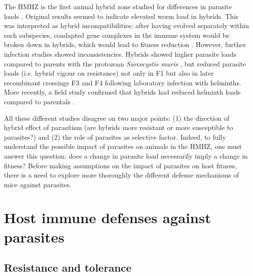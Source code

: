 The HMHZ is the first animal hybrid zone studied for differences in parasite loads \citep{sage_wormy_1986}. Original results seemed to indicate elevated worm load in hybrids. This was interpreted as hybrid incompatibilities: after having evolved separately within each subspecies, coadapted gene complexes in the immune system would be broken down in hybrids, which would lead to fitness reduction \citep{moulia_wormy_1991, moulia_experimental_1993, sage_wormy_1986}. However, further infection studies showed inconsistencies. Hybrids showed higher parasite loads compared to parents with the protozoan \textit{Sarcocystis muris} \citep{derothe_susceptibility_2001}, but reduced parasite loads (i.e. hybrid vigour on resistance) not only in F1 \citep{moulia_hybrid_1995} but also in later recombinant crossings F3 and F4 \citep{derothe_recombination_2004} following laboratory infection with helminths. More recently, a field study confirmed that hybrids had reduced helminth loads compared to parentals \citep{baird_where_2012}.
\par
All these different studies disagree on two major points: (1) the direction of hybrid effect of parasitism (are hybrids more resistant or more susceptible to parasites?) and (2) the role of parasites as selective factor. Indeed, to fully understand the possible impact of parasites on animals in the HMHZ, one must answer this question: does a change in parasite load necessarily imply a change in fitness? Before making assumptions on the impact of parasites on host fitness, there is a need to explore more thoroughly the different defense mechanisms of mice against parasites.

\section{Host immune defenses against parasites}
\subsection{Resistance and tolerance}

